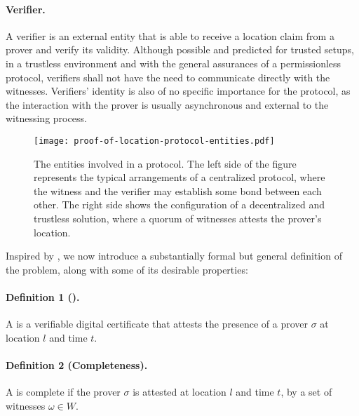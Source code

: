 \paragraph{Verifier.} A verifier is an external entity that is able to receive a location claim from a prover and verify its validity. Although possible and predicted for trusted setups, in a trustless environment and with the general assurances of a permissionless protocol, verifiers shall not have the need to communicate directly with the witnesses. Verifiers' identity is also of no specific importance for the protocol, as the interaction with the prover is usually asynchronous and external to the witnessing process.

\begin{figure}[ht]
    \begin{center}
    \texttt{[image: proof-of-location-protocol-entities.pdf]}
    \caption{The entities involved in a \pol{} protocol. The left side of the figure represents the typical arrangements of a centralized protocol, where the witness and the verifier may establish some bond between each other. The right side shows the configuration of a decentralized and trustless solution, where a quorum of witnesses attests the prover's location.}
    \label{fig:proof-of-location-protocol-entities}
    \end{center}
\end{figure}

Inspired by \cite{nasrulin2018robust, dupin2018location}, we now introduce a substantially formal but general definition of the \pol{} problem, along with some of its desirable properties:

\paragraph{Definition 1 (\pol{}).} A \pol{} is a verifiable digital certificate that attests the presence of a prover $\sigma$ at location $l$ and time $t$.

\paragraph{Definition 2 (Completeness).} A \pol{} is complete if the prover $\sigma$ is attested at location $l$ and time $t$, by a set of witnesses $\omega \in W$.

